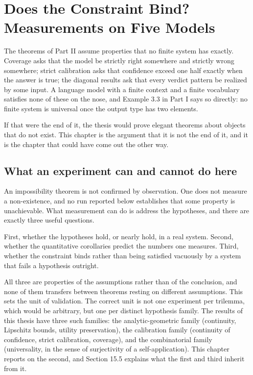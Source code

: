 \documentclass{memoir}
\begin{document}
\chapter{Does the Constraint Bind? Measurements on Five Models}\label{Two--Schemas--of--Impossibility-005F-005F-005F--Machine--Checked--Limits--of--Trustworthy--Machine--Learning-005F-005F-005F--and--Why--They--Tighten--with--Capability----Does--the--Constraint--Bind-005F-005F-005F--Measurements--on--Five--Models}

The theorems of Part II assume properties that no finite system has exactly.
Coverage asks that the model be strictly right somewhere and strictly wrong
somewhere; strict calibration asks that confidence exceed one half exactly when
the answer is true; the diagonal results ask that every verdict pattern be
realized by some input. A language model with a finite context and a finite
vocabulary satisfies none of these on the nose, and Example 3.3 in Part I says
so directly: no finite system is universal once the output type has two
elements.

If that were the end of it, the thesis would prove elegant theorems about
objects that do not exist. This chapter is the argument that it is not the end
of it, and it is the chapter that could have come out the other way.



\section{What an experiment can and cannot do here}\label{Two--Schemas--of--Impossibility-005F-005F-005F--Machine--Checked--Limits--of--Trustworthy--Machine--Learning-005F-005F-005F--and--Why--They--Tighten--with--Capability----Does--the--Constraint--Bind-005F-005F-005F--Measurements--on--Five--Models----What--an--experiment--can--and--cannot--do--here}

An impossibility theorem is not confirmed by observation. One does not measure a
non-existence, and no run reported below establishes that some property is
unachievable. What measurement can do is address the hypotheses, and there are
exactly three useful questions.

First, whether the hypotheses hold, or nearly hold, in a real system. Second,
whether the quantitative corollaries predict the numbers one measures. Third,
whether the constraint binds rather than being satisfied vacuously by a system
that fails a hypothesis outright.

All three are properties of the assumptions rather than of the conclusion, and
none of them transfers between theorems resting on different assumptions. This
sets the unit of validation. The correct unit is not one experiment per
trilemma, which would be arbitrary, but one per distinct hypothesis family. The
results of this thesis have three such families: the analytic-geometric family
(continuity, Lipschitz bounds, utility preservation), the calibration family
(continuity of confidence, strict calibration, coverage), and the combinatorial
family (universality, in the sense of surjectivity of a self-application). This
chapter reports on the second, and Section 15.5 explains what the first and
third inherit from it.
\end{document}
